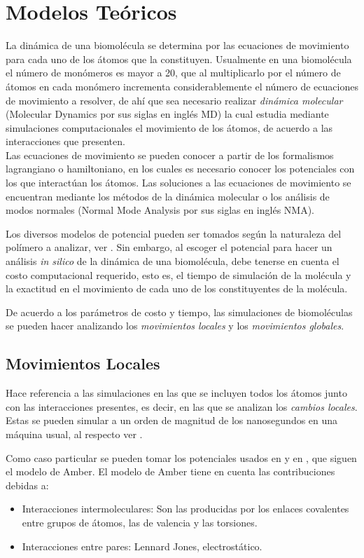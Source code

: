 \chapter{Modelos Te\'{o}ricos}
La din\'{a}mica de una biomol\'{e}cula se determina por las ecuaciones de movimiento para cada uno de los \'{a}tomos que la constituyen. Usualmente en una biomol\'{e}cula el n\'{u}mero de mon\'{o}meros es mayor a 20, que al multiplicarlo por el n\'{u}mero de \'{a}tomos en cada mon\'{o}mero incrementa considerablemente el n\'{u}mero de ecuaciones de movimiento a resolver, de ah\'{i} que sea necesario realizar \textit{din\'{a}mica molecular} (Molecular Dynamics por sus siglas en ingl\'{e}s MD) la cual estudia mediante simulaciones computacionales el movimiento de los \'{a}tomos, de acuerdo a las interacciones que presenten.\\

Las ecuaciones de movimiento se pueden conocer a partir de los formalismos lagrangiano o hamiltoniano, en los cuales es necesario conocer los potenciales con los que interact\'{u}an los \'{a}tomos. Las soluciones a las ecuaciones de movimiento se encuentran mediante los m\'{e}todos de la din\'{a}mica molecular o los an\'{a}lisis de modos normales (Normal Mode Analysis por sus siglas en ingl\'{e}s NMA).

Los diversos modelos de potencial pueden ser tomados según la naturaleza del pol\'{i}mero a analizar, ver \cite{Amb1}. Sin embargo, al escoger el potencial  para hacer un an\'{a}lisis \textit{in silico} de la din\'{a}mica de una biomol\'{e}cula, debe tenerse en cuenta el costo computacional requerido, esto es, el tiempo de simulaci\'{o}n de la mol\'{e}cula y la exactitud en el movimiento de cada uno de los constituyentes de la mol\'{e}cula.

De acuerdo a los par\'{a}metros de costo y tiempo, las simulaciones de biomol\'{e}culas se pueden hacer analizando los \textit{movimientos locales} y los \textit{movimientos globales}.

\section{Movimientos Locales}
Hace referencia a las simulaciones en las que se incluyen todos los \'{a}tomos junto con las interacciones presentes, es decir, en las que se analizan los \textit{cambios locales}. Estas se pueden simular a un orden de magnitud de los nanosegundos en una m\'{a}quina usual, al respecto ver \cite{glo}.

Como caso particular se pueden tomar los potenciales usados en \cite{Amb1} y en \cite{web:Amb2}, que siguen el modelo de Amber. El modelo de Amber tiene en cuenta las contribuciones debidas a:
 \begin{itemize}
\item Interacciones intermoleculares: Son las producidas por los enlaces covalentes entre grupos de \'{a}tomos, las de valencia y las torsiones.
\item Interacciones entre pares: Lennard Jones, electrost\'{a}tico.
\end{itemize}

